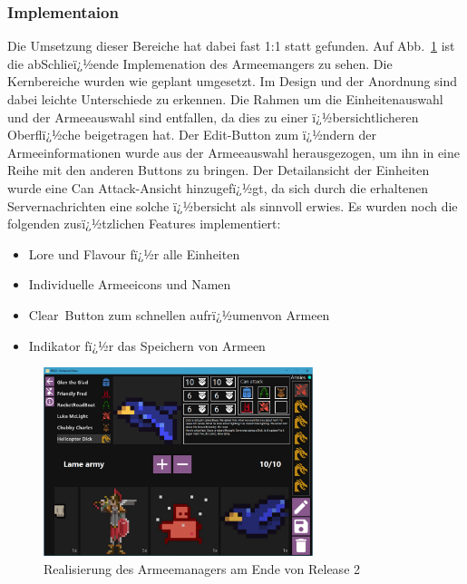 \documentclass[12pt, titlepage]{scrartcl}
\newcommand{\Abb}[1]{%
	Abb.\ \ref{#1}%
}
\begin{document}
			\subsubsection{Implementaion} Die Umsetzung dieser Bereiche hat dabei fast 1:1 statt gefunden. Auf \Abb{ImplementierungArmeemanager} ist die abSchlieï¿½ende Implemenation des Armeemangers zu sehen. Die Kernbereiche wurden wie geplant umgesetzt. Im Design und der Anordnung sind dabei leichte Unterschiede zu erkennen. Die Rahmen um die Einheitenauswahl und der Armeeauswahl sind entfallen, da dies zu einer ï¿½bersichtlicheren Oberflï¿½che beigetragen hat. Der Edit-Button zum ï¿½ndern der Armeeinformationen wurde aus der Armeeauswahl herausgezogen, um ihn in eine Reihe mit den anderen Buttons zu bringen. Der Detailansicht der Einheiten wurde eine Can Attack-Ansicht hinzugefï¿½gt, da sich durch die erhaltenen Servernachrichten eine solche ï¿½bersicht als sinnvoll erwies.
			Es wurden noch die folgenden zusï¿½tzlichen Features implementiert:
			\begin{itemize}
				\item Lore und Flavour fï¿½r alle Einheiten
				\item Individuelle Armeeicons und Namen
				\item Clear\ Button zum schnellen \glqq aufrï¿½umen\grqq von Armeen
				\item Indikator fï¿½r das Speichern von Armeen
			\end{itemize}
			
			\begin{figure}[H] 
				\centering
				\includegraphics[width=0.7\textwidth]{ArmyBuilder_final.PNG}
				\caption{Realisierung des Armeemanagers am Ende von Release 2}
				\label{ImplementierungArmeemanager}
			\end{figure}
		
\end{document}
